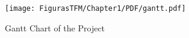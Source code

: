 			\begin{figure}[H]
			\centering
			\texttt{[image: FigurasTFM/Chapter1/PDF/gantt.pdf]}
			\caption{Gantt Chart of the Project}
			\label{fig:gantt}
			\end{figure}
















